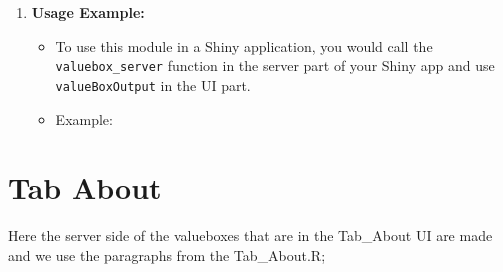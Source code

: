 \documentclass[
]{book}
\newenvironment{Shaded}{\begin{snugshade}}{\end{snugshade}}
\newcommand{\AttributeTok}[1]{\textcolor[rgb]{0.13,0.29,0.53}{#1}}
\newcommand{\DecValTok}[1]{\textcolor[rgb]{0.00,0.00,0.81}{#1}}
\newcommand{\FunctionTok}[1]{\textcolor[rgb]{0.13,0.29,0.53}{\textbf{#1}}}
\newcommand{\NormalTok}[1]{#1}
\newcommand{\OtherTok}[1]{\textcolor[rgb]{0.56,0.35,0.01}{#1}}
\newcommand{\SpecialCharTok}[1]{\textcolor[rgb]{0.81,0.36,0.00}{\textbf{#1}}}
\newcommand{\StringTok}[1]{\textcolor[rgb]{0.31,0.60,0.02}{#1}}
\providecommand{\tightlist}{%
  \setlength{\itemsep}{0pt}\setlength{\parskip}{0pt}}
\begin{document}
\begin{enumerate}
\def\labelenumi{\arabic{enumi}.}
\setcounter{enumi}{2}
\tightlist
\item
  \textbf{Usage Example:}

  \begin{itemize}
  \tightlist
  \item
    To use this module in a Shiny application, you would call the \texttt{valuebox\_server} function in the server part of your Shiny app and use \texttt{valueBoxOutput} in the UI part.
  \item
    Example:
  \end{itemize}
\end{enumerate}

\begin{Shaded}
\end{Shaded}

\hypertarget{tab-about}{%
\section{Tab About}\label{tab-about}}

Here the server side of the valueboxes that are in the Tab\_About UI are made and we use the paragraphs from the Tab\_About.R;
\end{document}
